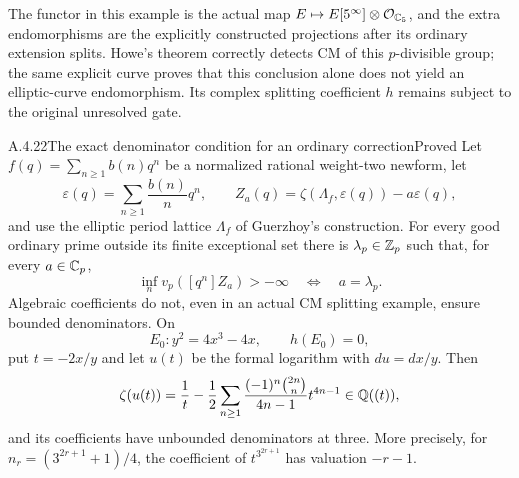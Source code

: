 The functor in this example is the actual map $E\mapsto E[5^\infty]\otimes\mathcal O_{\mathbb C_5}$, and the extra endomorphisms are the explicitly constructed projections after its ordinary extension splits. Howe's theorem correctly detects CM of this $p$-divisible group; the same explicit curve proves that this conclusion alone does not yield an elliptic-curve endomorphism. Its complex splitting coefficient $h$ remains subject to the original unresolved gate.

\begin{result}{A.4.22}{The exact denominator condition for an ordinary correction}{Proved}
Let $f(q)=\sum_{n\ge1}b(n)q^n$ be a normalized rational weight-two newform, let
\[
 \varepsilon(q)=\sum_{n\ge1}\frac{b(n)}n q^n,
 \qquad Z_a(q)=\zeta(\Lambda_f,\varepsilon(q))-a\varepsilon(q),
\]
and use the elliptic period lattice $\Lambda_f$ of Guerzhoy's construction. For every good ordinary prime outside its finite exceptional set there is $\lambda_p\in\mathbb Z_p$ such that, for every $a\in\mathbb C_p$,
\[
 \inf_n v_p([q^n]Z_a)>-\infty
 \quad\Longleftrightarrow\quad a=\lambda_p.
\]
Algebraic coefficients do not, even in an actual CM splitting example, ensure bounded denominators. On
\[
 E_0:y^2=4x^3-4x,\qquad h(E_0)=0,
\]
put $t=-2x/y$ and let $u(t)$ be the formal logarithm with $du=dx/y$. Then
\[
 \zeta(u(t))=\frac1t-\frac12\sum_{n\ge1}
 \frac{(-1)^n\binom{2n}{n}}{4n-1}t^{4n-1}\in\mathbb Q((t)),
\]
and its coefficients have unbounded denominators at three. More precisely, for
$n_r=(3^{2r+1}+1)/4$, the coefficient of $t^{3^{2r+1}}$ has valuation $-r-1$.
\end{result}
